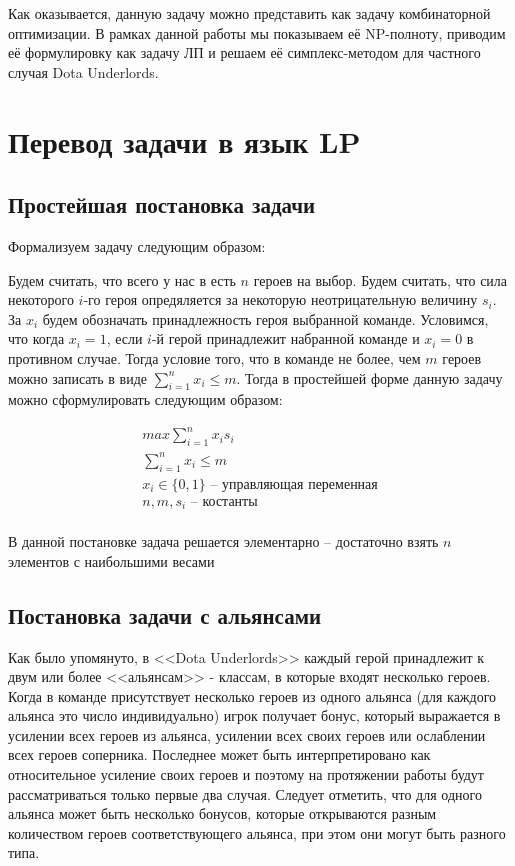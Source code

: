 \documentclass{article}
\begin{document}
Как оказывается, данную задачу можно представить как задачу комбинаторной оптимизации. В рамках данной работы мы показываем её NP-полноту, приводим её формулировку как задачу ЛП и решаем её симплекс-методом для частного случая Dota Underlords.

\section{Перевод задачи в язык LP}

\subsection{Простейшая постановка задачи}

Формализуем задачу следующим образом:

Будем считать, что всего у нас в есть $n$ героев на выбор. Будем считать, что сила некоторого $i$-го героя опредяляется за некоторую неотрицательную величину $s_i$. За $x_i$ будем обозначать принадлежность героя выбранной команде. Условимся, что когда $x_i = 1$, если $i$-й герой принадлежит набранной команде и $x_i=0$ в противном случае. Тогда условие того, что в команде не более, чем $m$ героев можно записать в виде $\sum_{i=1}^n x_i \leq m$. Тогда в простейшей форме данную задачу можно сформулировать следующим образом:

\begin{equation}
\begin{gathered}
    max \sum_{i=1}^n x_i s_i \\
    \sum_{i=1}^n x_i \leq m \\
    x_i \in \{0, 1\} \text{ – управляющая переменная} \\
   n, m, s_i \text{ – костанты}  \\
\end{gathered}
\end{equation}

В данной постановке задача решается элементарно – достаточно взять $n$ элементов с наибольшими весами

\subsection{Постановка задачи с альянсами}
Как было упомянуто, в <<Dota Underlords>>  каждый герой принадлежит к двум или более <<альянсам>> - классам, в которые входят несколько героев.  Когда в команде присутствует несколько героев из одного альянса (для каждого альянса это число индивидуально) игрок получает бонус, который выражается в усилении всех героев из альянса, усилении всех своих героев или ослаблении всех героев соперника. Последнее может быть интерпретировано как относительное усиление своих героев и поэтому на протяжении работы будут рассматриваться только первые два случая. Следует отметить, что для одного альянса может быть несколько бонусов, которые открываются разным количеством героев соответствующего альянса, при этом они могут быть разного типа.
\end{document}
